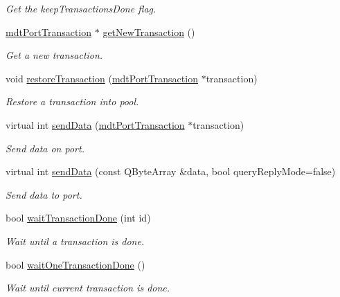 \begin{DoxyCompactItemize}
\begin{DoxyCompactList}\small\item\em Get the keepTransactionsDone flag. \end{DoxyCompactList}\item 
\hyperlink{classmdt_port_transaction}{mdtPortTransaction} $\ast$ \hyperlink{classmdt_port_manager_a75ebd3d1859e3ed38b9558981e53aac4}{getNewTransaction} ()
\begin{DoxyCompactList}\small\item\em Get a new transaction. \end{DoxyCompactList}\item 
void \hyperlink{classmdt_port_manager_a5fea4a9b8e94d38e8ec699dba05c7ca8}{restoreTransaction} (\hyperlink{classmdt_port_transaction}{mdtPortTransaction} $\ast$transaction)
\begin{DoxyCompactList}\small\item\em Restore a transaction into pool. \end{DoxyCompactList}\item 
virtual int \hyperlink{classmdt_port_manager_ad98399edba146af5cf32a9002094385c}{sendData} (\hyperlink{classmdt_port_transaction}{mdtPortTransaction} $\ast$transaction)
\begin{DoxyCompactList}\small\item\em Send data on port. \end{DoxyCompactList}\item 
virtual int \hyperlink{classmdt_port_manager_a445b27f0819158f67f1bd548cdd2fedf}{sendData} (const QByteArray \&data, bool queryReplyMode=false)
\begin{DoxyCompactList}\small\item\em Send data to port. \end{DoxyCompactList}\item 
bool \hyperlink{classmdt_port_manager_a5551802de2c08632078f2cc0e2607913}{waitTransactionDone} (int id)
\begin{DoxyCompactList}\small\item\em Wait until a transaction is done. \end{DoxyCompactList}\item 
bool \hyperlink{classmdt_port_manager_af60f089baded850018cbb90645c8e547}{waitOneTransactionDone} ()
\begin{DoxyCompactList}\small\item\em Wait until current transaction is done. \end{DoxyCompactList}\item 

\end{DoxyCompactItemize}
